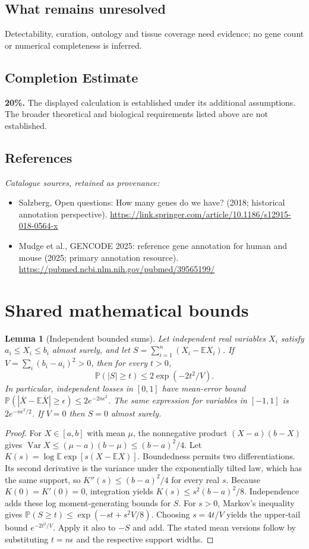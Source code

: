 \documentclass[11pt]{article}
\newcommand{\E}{\mathbb E}
\newcommand{\Prob}{\mathbb P}
\DeclareMathOperator{\Var}{Var}
\providecommand{\E}{\mathbb E}
\providecommand{\Prob}{\mathbb P}
\providecommand{\Var}{\operatorname{Var}}
\newtheorem{sharedlemma}{Lemma}[section]
\begin{document}
\subsection{What remains unresolved}
Detectability, curation, ontology and tissue coverage need evidence; no gene count or numerical completeness is inferred.
\subsection{Completion Estimate}
\textbf{20\%.} The displayed calculation is established under its additional assumptions. The broader theoretical and biological requirements listed above are not established.
\subsection{References}
\noindent\emph{Catalogue sources, retained as provenance:}
\begin{itemize}
\item Salzberg, Open questions: How many genes do we have? (2018; historical annotation perspective). \url{https://link.springer.com/article/10.1186/s12915-018-0564-x}
\item Mudge et al., GENCODE 2025: reference gene annotation for human and mouse (2025; primary annotation resource). \url{https://pubmed.ncbi.nlm.nih.gov/pubmed/39565199/}
\end{itemize}
\clearpage


\appendix
\section{Shared mathematical bounds}\label{app:bounds}
\begin{sharedlemma}[Independent bounded sums]\label{lem:bounded}
Let independent real variables $X_i$ satisfy $a_i\leq X_i\leq b_i$ almost surely,
and let $S=\sum_{i=1}^n(X_i-\E X_i)$. If
$V=\sum_i(b_i-a_i)^2>0$, then for every $t>0$,
\[
 \Prob(|S|\geq t)\leq 2\exp(-2t^2/V).
\]
In particular, independent losses in $[0,1]$ have mean-error bound
$\Prob(|\overline X-\E\overline X|\geq\epsilon)
\leq2e^{-2n\epsilon^2}$. The same expression for variables in $[-1,1]$
is $2e^{-n\epsilon^2/2}$. If $V=0$ then $S=0$ almost surely.
\end{sharedlemma}
\begin{proof}
For $X\in[a,b]$ with mean $\mu$, the nonnegative product
$(X-a)(b-X)$ gives
$\Var X\leq(\mu-a)(b-\mu)\leq(b-a)^2/4$.
Let $K(s)=\log\E\exp[s(X-\E X)]$.
Boundedness permits two differentiations. Its second derivative is the variance
under the exponentially tilted law, which has the same support, so
$K''(s)\leq(b-a)^2/4$ for every real $s$.
Because $K(0)=K'(0)=0$, integration yields
$K(s)\leq s^2(b-a)^2/8$.
Independence adds these log moment-generating bounds for $S$.
For $s>0$, Markov's inequality gives
$\Prob(S\geq t)\leq\exp(-st+s^2V/8)$.
Choosing $s=4t/V$ yields the upper-tail bound $e^{-2t^2/V}$.
Apply it also to $-S$ and add. The stated mean versions follow by substituting
$t=n\epsilon$ and the respective support widths.
\end{proof}
\end{document}
